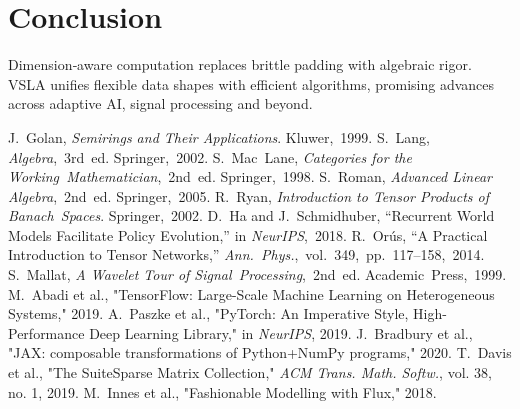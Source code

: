 \documentclass[11pt]{article}
\begin{document}
\clearpage
\section{Conclusion}
Dimension‑aware computation replaces brittle padding with algebraic rigor.  VSLA unifies flexible data shapes with efficient algorithms, promising advances across adaptive AI, signal processing and beyond.

\begin{thebibliography}{9}
\footnotesize
{} J.~Golan, \emph{Semirings and Their Applications}. Kluwer, 1999.
 S.~Lang, \emph{Algebra}, 3rd ed. Springer, 2002.
 S.~Mac~Lane, \emph{Categories for the Working Mathematician}, 2nd ed. Springer, 1998.
 S.~Roman, \emph{Advanced Linear Algebra}, 2nd ed. Springer, 2005.
 R.~Ryan, \emph{Introduction to Tensor Products of Banach Spaces}. Springer, 2002.
 D.~Ha and J.~Schmidhuber, “Recurrent World Models Facilitate Policy Evolution,” in \emph{NeurIPS}, 2018.
 R.~Orús, “A Practical Introduction to Tensor Networks,” \emph{Ann. Phys.}, vol. 349, pp. 117–158, 2014.
 S.~Mallat, \emph{A Wavelet Tour of Signal Processing}, 2nd ed. Academic Press, 1999.
 M.~Abadi et al., "TensorFlow: Large-Scale Machine Learning on Heterogeneous Systems," 2019.
 A.~Paszke et al., "PyTorch: An Imperative Style, High-Performance Deep Learning Library," in \emph{NeurIPS}, 2019.
 J.~Bradbury et al., "JAX: composable transformations of Python+NumPy programs," 2020.
 T.~Davis et al., "The SuiteSparse Matrix Collection," \emph{ACM Trans. Math. Softw.}, vol. 38, no. 1, 2019.
 M.~Innes et al., "Fashionable Modelling with Flux," 2018.
\end{thebibliography}
\end{document}
